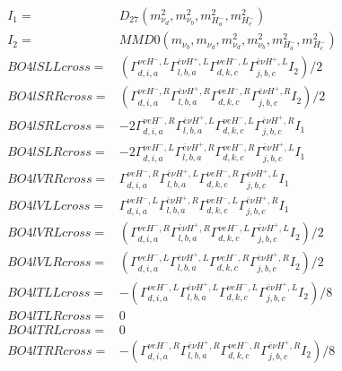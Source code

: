 \documentclass[A4,landscape]{article}
\begin{document}
\begin{align} 
I_1 = & D_{27}(m^2_{\nu_{{d}}}, m^2_{\nu_{{b}}}, m^2_{H^-_{{a}}}, m^2_{H^-_{{c}}}) \\ 
I_2 = & MMD0(m_{\nu_{{b}}}, m_{\nu_{{d}}}, m^2_{\nu_{{d}}}, m^2_{\nu_{{b}}}, m^2_{H^-_{{a}}}, m^2_{H^-_{{c}}}) \\ 
  BO4lSLLcross= & ( \Gamma^{\nu e H^- ,L}_{d, i, a} \Gamma^{\bar{e}\nu H^+,L}_{l, b, a} \Gamma^{\nu e H^- ,L}_{d, k, c} \Gamma^{\bar{e}\nu H^+,L}_{j, b, c} I_2)/2 \\ 
  BO4lSRRcross= & ( \Gamma^{\nu e H^- ,R}_{d, i, a} \Gamma^{\bar{e}\nu H^+,R}_{l, b, a} \Gamma^{\nu e H^- ,R}_{d, k, c} \Gamma^{\bar{e}\nu H^+,R}_{j, b, c} I_2)/2 \\ 
  BO4lSRLcross= & -2  \Gamma^{\nu e H^- ,R}_{d, i, a} \Gamma^{\bar{e}\nu H^+,L}_{l, b, a} \Gamma^{\nu e H^- ,L}_{d, k, c} \Gamma^{\bar{e}\nu H^+,R}_{j, b, c} I_1 \\ 
  BO4lSLRcross= & -2  \Gamma^{\nu e H^- ,L}_{d, i, a} \Gamma^{\bar{e}\nu H^+,R}_{l, b, a} \Gamma^{\nu e H^- ,R}_{d, k, c} \Gamma^{\bar{e}\nu H^+,L}_{j, b, c} I_1 \\ 
  BO4lVRRcross= &  \Gamma^{\nu e H^- ,R}_{d, i, a} \Gamma^{\bar{e}\nu H^+,L}_{l, b, a} \Gamma^{\nu e H^- ,R}_{d, k, c} \Gamma^{\bar{e}\nu H^+,L}_{j, b, c} I_1 \\ 
  BO4lVLLcross= &  \Gamma^{\nu e H^- ,L}_{d, i, a} \Gamma^{\bar{e}\nu H^+,R}_{l, b, a} \Gamma^{\nu e H^- ,L}_{d, k, c} \Gamma^{\bar{e}\nu H^+,R}_{j, b, c} I_1 \\ 
  BO4lVRLcross= & ( \Gamma^{\nu e H^- ,R}_{d, i, a} \Gamma^{\bar{e}\nu H^+,R}_{l, b, a} \Gamma^{\nu e H^- ,L}_{d, k, c} \Gamma^{\bar{e}\nu H^+,L}_{j, b, c} I_2)/2 \\ 
  BO4lVLRcross= & ( \Gamma^{\nu e H^- ,L}_{d, i, a} \Gamma^{\bar{e}\nu H^+,L}_{l, b, a} \Gamma^{\nu e H^- ,R}_{d, k, c} \Gamma^{\bar{e}\nu H^+,R}_{j, b, c} I_2)/2 \\ 
  BO4lTLLcross= & -( \Gamma^{\nu e H^- ,L}_{d, i, a} \Gamma^{\bar{e}\nu H^+,L}_{l, b, a} \Gamma^{\nu e H^- ,L}_{d, k, c} \Gamma^{\bar{e}\nu H^+,L}_{j, b, c} I_2)/8 \\ 
  BO4lTLRcross= & 0 \\ 
  BO4lTRLcross= & 0 \\ 
  BO4lTRRcross= & -( \Gamma^{\nu e H^- ,R}_{d, i, a} \Gamma^{\bar{e}\nu H^+,R}_{l, b, a} \Gamma^{\nu e H^- ,R}_{d, k, c} \Gamma^{\bar{e}\nu H^+,R}_{j, b, c} I_2)/8 \\ 
\end{align} 
\end{document}
